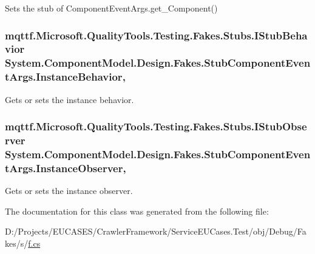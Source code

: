 Sets the stub of Component\-Event\-Args.\-get\-\_\-\-Component()

\hypertarget{class_system_1_1_component_model_1_1_design_1_1_fakes_1_1_stub_component_event_args_ac3e94e9232c9aa52f6fafe3b231131fb}{
\subsubsection[{Instance\-Behavior}]{\setlength{\rightskip}{0pt plus 5cm}mqttf.\-Microsoft.\-Quality\-Tools.\-Testing.\-Fakes.\-Stubs.\-I\-Stub\-Behavior System.\-Component\-Model.\-Design.\-Fakes.\-Stub\-Component\-Event\-Args.\-Instance\-Behavior\hspace{0.3cm}{\ttfamily [get]}, {\ttfamily [set]}}}\label{class_system_1_1_component_model_1_1_design_1_1_fakes_1_1_stub_component_event_args_ac3e94e9232c9aa52f6fafe3b231131fb}


Gets or sets the instance behavior.

\hypertarget{class_system_1_1_component_model_1_1_design_1_1_fakes_1_1_stub_component_event_args_acb43080a9f96be12767279a4009e7187}{
\subsubsection[{Instance\-Observer}]{\setlength{\rightskip}{0pt plus 5cm}mqttf.\-Microsoft.\-Quality\-Tools.\-Testing.\-Fakes.\-Stubs.\-I\-Stub\-Observer System.\-Component\-Model.\-Design.\-Fakes.\-Stub\-Component\-Event\-Args.\-Instance\-Observer\hspace{0.3cm}{\ttfamily [get]}, {\ttfamily [set]}}}\label{class_system_1_1_component_model_1_1_design_1_1_fakes_1_1_stub_component_event_args_acb43080a9f96be12767279a4009e7187}


Gets or sets the instance observer.



The documentation for this class was generated from the following file\-:\begin{DoxyCompactItemize}
\item 
D\-:/\-Projects/\-E\-U\-C\-A\-S\-E\-S/\-Crawler\-Framework/\-Service\-E\-U\-Cases.\-Test/obj/\-Debug/\-Fakes/s/\hyperlink{s_2f_8cs}{f.\-cs}\end{DoxyCompactItemize}
